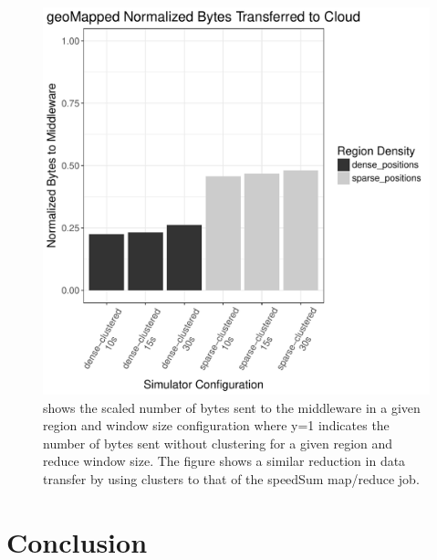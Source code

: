 \documentclass{thesis}
\begin{document}
    \begin{figure}
        \centering
        \includegraphics[scale=.8]{binImages/geoMapped-runplot-normalized.pdf}
        \caption{shows the scaled number of bytes sent to the middleware in a given region and window size
        configuration where y=1 indicates the number of bytes sent without clustering for a given region
        and reduce window size. The figure shows a similar reduction in data transfer by using clusters
        to that of the speedSum map/reduce job.}
    \end{figure}

\chapter{Conclusion}
\end{document}

